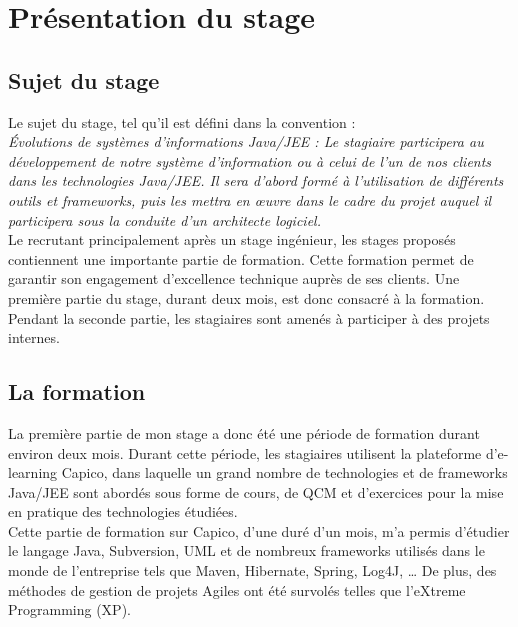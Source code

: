 \chapter{Présentation du stage}

\section{Sujet du stage}

Le sujet du stage, tel qu'il est défini dans la convention :\\

\emph{Évolutions de systèmes d'informations Java/JEE : Le stagiaire participera au développement de notre système d'information ou à celui de l'un de nos clients dans les technologies Java/JEE. Il sera d'abord formé à l'utilisation de différents outils et frameworks, puis les mettra en \oe{}uvre dans le cadre du projet auquel il participera sous la conduite d'un architecte logiciel.}\\

Le \excilysGroup{} recrutant principalement après un stage ingénieur, les stages proposés contiennent une importante partie de formation. Cette formation permet de garantir son engagement d'excellence technique auprès de ses clients. Une première partie du stage, durant deux mois, est donc consacré à la formation. Pendant la seconde partie, les stagiaires sont amenés à participer à des projets internes.

\section{La formation}

La première partie de mon stage a donc été une période de formation durant environ deux mois. Durant cette période, les stagiaires utilisent la plateforme d'e-learning Capico, dans laquelle un grand nombre de technologies et de frameworks Java/JEE sont abordés sous forme de cours, de QCM et d'exercices pour la mise en pratique des technologies étudiées.\\

Cette partie de formation sur Capico, d'une duré d'un mois, m'a permis d'étudier le langage Java, Subversion, UML et de nombreux frameworks utilisés dans le monde de l'entreprise tels que Maven, Hibernate, Spring, Log4J, \dots{} De plus, des méthodes de gestion de projets Agiles ont été survolés telles que l'eXtreme Programming (XP).\\

